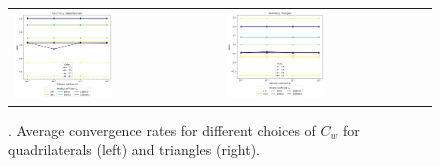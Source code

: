 \begin{figure}[h!]
	\centering
	\begin{tabular}{p{} p{}}
		\vspace{0pt}
        \includegraphics[width=0.49\textwidth]{../figs/parametric/diffusion_2D/ord_laplace_2_4}
		&
		\vspace{0pt}
        \includegraphics[width=0.49\textwidth]{../figs/parametric/diffusion_2D/ord_laplace_2_3}
	\end{tabular}
	\caption{. Average convergence rates for different choices of $C_w$
	for quadrilaterals (left) and triangles (right).}
	\label{fig:orders_lapalce}
\end{figure}


